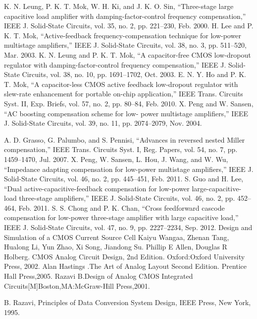 \documentclass[a4paper,12pt]{article} %
\begin{document}
\begin{thebibliography}{}
 K. N. Leung, P. K. T. Mok, W. H. Ki, and J. K. O. Sin, “Three-stage
large capacitive load amplifier with damping-factor-control frequency
compensation,” IEEE J. Solid-State Circuits, vol. 35, no. 2, pp.
221–230, Feb. 2000.
 H. Lee and P. K. T. Mok, “Active-feedback frequency-compensation
technique for low-power multistage amplifiers,” IEEE J. Solid-State
Circuits, vol. 38, no. 3, pp. 511–520, Mar. 2003.
 K. N. Leung and P. K. T. Mok, “A capacitor-free CMOS low-dropout
regulator with damping-factor-control frequency compensation,” IEEE
J. Solid-State Circuits, vol. 38, no. 10, pp. 1691–1702, Oct. 2003.
 E. N. Y. Ho and P. K. T. Mok, “A capacitor-less CMOS active feedback
low-dropout regulator with slew-rate enhancement for portable on-chip
application,” IEEE Trans. Circuits Syst. II, Exp. Briefs, vol. 57, no. 2,
pp. 80–84, Feb. 2010.
 X. Peng and W. Sansen, “AC boosting compensation scheme for low-
power multistage amplifiers,” IEEE J. Solid-State Circuits, vol. 39, no.
11, pp. 2074–2079, Nov. 2004.

 A. D. Grasso, G. Palumbo, and S. Pennisi, “Advances in reversed
nested Miller compensation,” IEEE Trans. Circuits Syst. I, Reg.
Papers, vol. 54, no. 7, pp. 1459–1470, Jul. 2007.
 X. Peng, W. Sansen, L. Hou, J. Wang, and W. Wu, “Impedance adapting compensation for low-power multistage amplifiers,” IEEE J. Solid-State Circuits, vol. 46, no. 2, pp. 445–451, Feb. 2011.
 S. Guo and H. Lee, “Dual active-capacitive-feedback compensation
for low-power large-capacitive-load three-stage amplifiers,” IEEE J.
Solid-State Circuits, vol. 46, no. 2, pp. 452–464, Feb. 2011.
 S. S. Chong and P. K. Chan, “Cross feedforward cascode compensation
for low-power three-stage amplifier with large capacitive load,” IEEE
J. Solid-State Circuits, vol. 47, no. 9, pp. 2227–2234, Sep. 2012.
 Design and Simulation of a CMOS Current Source Cell
Kaiyu Wangaa, Zhenan Tang, Hualong Li, Yun Zhao, Xi Song,
Jiandong Su.
 Phillip E Allen, Douglas R Holberg. CMOS Analog Circuit Design, 2nd Edition. Oxford:Oxford University Press, 2002.
Alan Hastings .The Art of Analog Layout Second Edition. Prentice Hall Press,2005.
Razavi B.Design of Analog CMOS Integrated Circuits[M]Boston,MA:McGraw-Hill Press,2001.

 B. Razavi, Principles of Data Conversion System Design, IEEE Press, New York, 1995.

\end{thebibliography}
\end{document}
